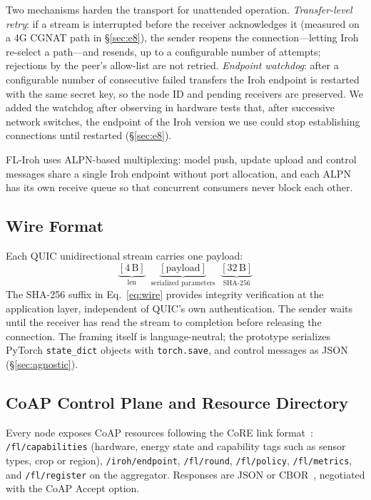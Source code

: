 Two mechanisms harden the transport for unattended operation. \emph{Transfer-level retry}: if a stream is interrupted before the receiver acknowledges it (measured on a 4G CGNAT path in \S\ref{sec:e8}), the sender reopens the connection---letting Iroh re-select a path---and resends, up to a configurable number of attempts; rejections by the peer's allow-list are not retried. \emph{Endpoint watchdog}: after a configurable number of consecutive failed transfers the Iroh endpoint is restarted with the same secret key, so the node ID and pending receivers are preserved. We added the watchdog after observing in hardware tests that, after successive network switches, the endpoint of the Iroh version we use could stop establishing connections until restarted (\S\ref{sec:e8}).

FL-Iroh uses ALPN-based multiplexing: model push, update upload and control messages share a single Iroh endpoint without port allocation, and each ALPN has its own receive queue so that concurrent consumers never block each other.

\subsection{Wire Format}
\label{sec:wire}

Each QUIC unidirectional stream carries one payload:
\begin{equation}
\underbrace{[4\,\text{B}]}_{\text{len}} \;\; \underbrace{[\text{payload}]}_{\text{serialized parameters}} \;\; \underbrace{[32\,\text{B}]}_{\text{SHA-256}}
\label{eq:wire}
\end{equation}
The SHA-256 suffix in Eq.~\eqref{eq:wire} provides integrity verification at the application layer, independent of QUIC's own authentication. The sender waits until the receiver has read the stream to completion before releasing the connection. The framing itself is language-neutral; the prototype serializes PyTorch \texttt{state\_dict} objects with \texttt{torch.save}, and control messages as JSON (\S\ref{sec:agnostic}).

\subsection{CoAP Control Plane and Resource Directory}
\label{sec:coap}

Every node exposes CoAP resources following the CoRE link format~\cite{rfc6690}: \texttt{/fl/capabilities} (hardware, energy state and capability tags such as sensor types, crop or region), \texttt{/iroh/endpoint}, \texttt{/fl/round}, \texttt{/fl/policy}, \texttt{/fl/metrics}, and \texttt{/fl/register} on the aggregator. Responses are JSON or CBOR~\cite{rfc8949}, negotiated with the CoAP Accept option.

